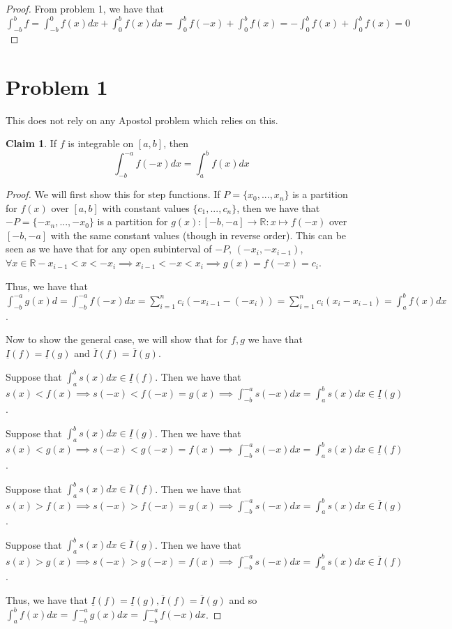 \documentclass[12pt,letterpaper]{article}
\theoremstyle{definition}
\newtheorem*{claim}{Claim}
\newcommand{\R}{\mathbb{R}}
\begin{document}
\begin{proof}
  From problem 1, we have that $\int_{-b}^b f = \int_{-b}^0f(x)dx  + \int_0^b f(x)dx = \int_0^b f(-x) + \int_0^b f(x)  = -\int_0^b f(x) + \int_0^b f(x) = 0 $
\end{proof}

\section*{Problem 1}

This does not rely on any Apostol problem which relies on this.

\begin{claim}
  If $f$ is integrable on $[a,b]$, then
  \[
    \int_{-b}^{-a}f(-x)dx = \int_a^b f(x)dx
  \]
\end{claim}

\begin{proof}
  We will first show this for step functions. If $P = \{x_0,...,x_n\}$ is a partition for $f(x)$ over $[a,b]$ with constant values $\{c_1,...,c_n\}$, then we have that $-P = \{-x_n,...,-x_0\}$ is a partition for $g(x):[-b,-a] \rightarrow \R: x \mapsto f(-x)$ over $[-b, -a]$ with the same constant values (though in reverse order). This can be seen as we have that for any open subinterval of $-P$, $(-x_i, -x_{i-1})$, $\forall x \in \R -x_{i-1} < x < -x_i \implies x_{i-1} < -x < x_i \implies g(x) = f(-x) = c_i$.
  
  Thus, we have that $\int_{-b}^{-a}g(x)d = \int_{-b}^{-a}f(-x)dx = \sum_{i=1}^n c_i(-x_{i-1} - (-x_i)) = \sum_{i=1}^n c_i(x_i - x_{i-1}) = \int_a^b f(x)dx$.
  
  Now to show the general case, we will show that for $f,g$ we have that $\underline{I}(f) = \underline{I}(g)$ and $\overline{I}(f) = \overline{I}(g)$. 

  Suppose that $\int_a^b s(x)dx \in \underline{I}(f)$. Then we have that $s(x) <
  f(x) \implies s(-x) < f(-x) =g(x) \implies \int_{-b}^{-a}s(-x)dx =
  \int_a^bs(x)dx \in \underline{I}(g)$.

  Suppose that $\int_a^b s(x)dx \in \underline{I}(g)$. Then we have that $s(x) <
  g(x) \implies s(-x) < g(-x) = f(x) \implies \int_{-b}^{-a}s(-x)dx = \int_a^bs(x)dx \in
  \underline{I}(f)$.
  
  Suppose that $\int_a^b s(x)dx \in \overline{I}(f)$. Then we have that $s(x) >
  f(x) \implies s(-x) > f(-x) =g(x) \implies \int_{-b}^{-a}s(-x)dx =
  \int_a^bs(x)dx \in \overline{I}(g)$.

  Suppose that $\int_a^b s(x)dx \in \overline{I}(g)$. Then we have that $s(x) >
  g(x) \implies s(-x) > g(-x) = f(x) \implies \int_{-b}^{-a}s(-x)dx = \int_a^bs(x)dx \in
  \overline{I}(f)$.
  
  Thus, we have that $\underline{I}(f) = \underline{I}(g), \overline{I}(f) =
  \overline{I}(g)$ and so $\int_a^b f(x)dx = \int_{-b}^{-a}g(x)dx = \int_{-b}^{-a}f(-x)dx$. 
\end{proof}
\end{document}
